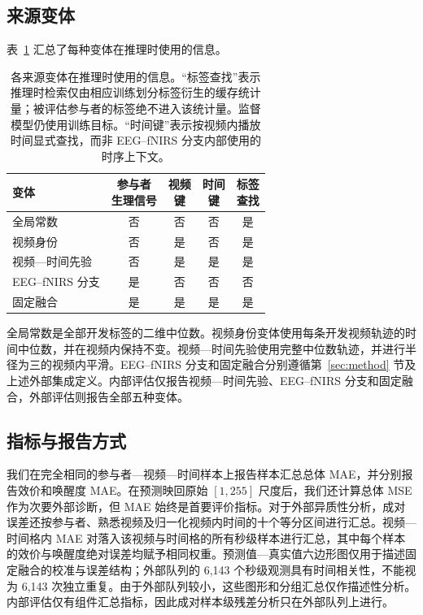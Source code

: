 \subsection{来源变体}

表~\ref{tab:source-variants} 汇总了每种变体在推理时使用的信息。

\begin{table}[H]
  \caption{各来源变体在推理时使用的信息。“标签查找”表示推理时检索仅由相应训练划分标签衍生的缓存统计量；被评估参与者的标签绝不进入该统计量。监督模型仍使用训练目标。“时间键”表示按视频内播放时间显式查找，而非 EEG--fNIRS 分支内部使用的时序上下文。}
  \label{tab:source-variants}
  \centering
  \scriptsize
  \setlength{\tabcolsep}{3.1pt}
  \begin{tabular}{@{}lcccc@{}}
    \toprule
    变体 &
    \shortstack{参与者\\生理信号} &
    \shortstack{视频\\键} &
    \shortstack{时间\\键} &
    \shortstack{标签\\查找} \\
    \midrule
    全局常数 & 否 & 否 & 否 & 是 \\
    视频身份 & 否 & 是 & 否 & 是 \\
    视频—时间先验 & 否 & 是 & 是 & 是 \\
    EEG--fNIRS 分支 & 是 & 否 & 否 & 否 \\
    固定融合 & 是 & 是 & 是 & 是 \\
    \bottomrule
  \end{tabular}
\end{table}

全局常数是全部开发标签的二维中位数。视频身份变体使用每条开发视频轨迹的时间中位数，并在视频内保持不变。视频—时间先验使用完整中位数轨迹，并进行半径为三的视频内平滑。EEG--fNIRS 分支和固定融合分别遵循第~\ref{sec:method} 节及上述外部集成定义。内部评估仅报告视频—时间先验、EEG--fNIRS 分支和固定融合，外部评估则报告全部五种变体。

\subsection{指标与报告方式}

我们在完全相同的参与者—视频—时间样本上报告样本汇总总体 MAE，并分别报告效价和唤醒度 MAE。在预测映回原始 \([1,255]\) 尺度后，我们还计算总体 MSE 作为次要外部诊断，但 MAE 始终是首要评价指标。对于外部异质性分析，成对误差还按参与者、熟悉视频及归一化视频内时间的十个等分区间进行汇总。视频—时间格内 MAE 对落入该视频与时间格的所有秒级样本进行汇总，其中每个样本的效价与唤醒度绝对误差均赋予相同权重。预测值—真实值六边形图仅用于描述固定融合的校准与误差结构；外部队列的 6,143 个秒级观测具有时间相关性，不能视为 6,143 次独立重复。由于外部队列较小，这些图形和分组汇总仅作描述性分析。内部评估仅有组件汇总指标，因此成对样本级残差分析只在外部队列上进行。

